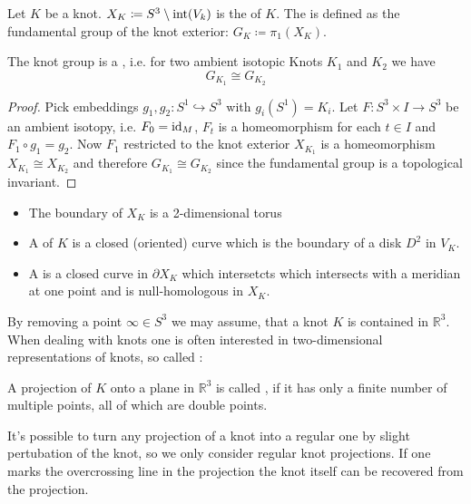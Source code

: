 \begin{definition}
	Let $K$ be a knot. $X_K \coloneqq S^3 \setminus \operatorname{int}(V_k)$ is the  of $K$.
	The  is defined as the fundamental group of the knot exterior: $G_K \coloneqq \pi_1(X_K)$.
\end{definition}

\begin{lemma}
	The knot group is a , i.e. for two ambient isotopic Knots $K_1$ and $K_2$ we have
	\[
		G_{K_1} \cong G_{K_2}
	\]
\end{lemma}
\begin{proof}
	Pick embeddings $g_1, g_2 \colon S^1 \hookrightarrow S^3$ with $g_i(S^1)=K_i$.
	Let $F \colon S^3 \times I \to S^3$ be an ambient isotopy, i.e. $F_0 = {\operatorname{id}_M}$, $F_t$ is a homeomorphism for each $t \in I$ and $F_1 \circ g_1 = g_2$.
	Now $F_1$ restricted to the knot exterior $X_{K_1}$ is a homeomorphism $X_{K_1} \cong X_{K_2}$ and therefore $G_{K_1} \cong G_{K_2}$ since the fundamental group is a topological invariant.
\end{proof}

\begin{remark}
	\begin{itemize}
		\item The boundary of $X_K$ is a 2-dimensional torus
		\item A  of $K$ is a closed (oriented) curve which is the boundary of a disk $D^2$ in $V_K$.
		\item A  is a closed curve in $\partial X_K$ which intersetcts which intersects with a meridian at one point and is null-homologous in $X_K$.
	\end{itemize}
\end{remark}

By removing a point $\infty \in S^3$ we may assume, that a knot $K$ is contained in $\mathbb{R}^3$.
When dealing with knots one is often interested in two-dimensional representations of knots, so called :

\begin{definition}
	A projection of $K$ onto a plane in $\mathbb{R}^3$ is called , if it has only a finite number of multiple points, all of which are double points.
\end{definition}

It's possible to turn any projection of a knot into a regular one by slight pertubation of the knot, so we only consider regular knot projections.
If one marks the overcrossing line in the projection the knot itself can be recovered from the projection.

